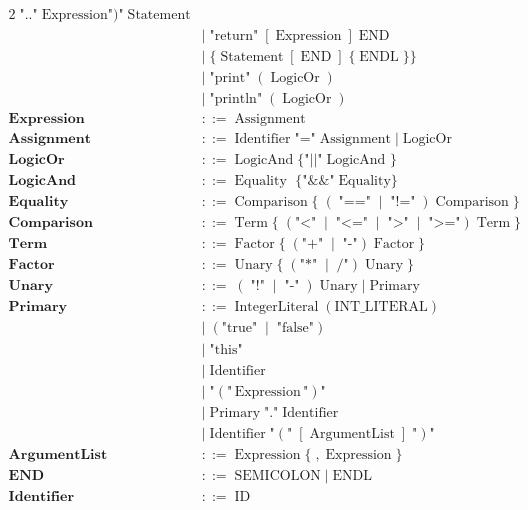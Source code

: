 \documentclass[a4paper,10pt]{article}
\begin{document}
\begin{alignat*}{2}
     \;\text{".."}\;\text{Expression} \text{"})\text{"}\;\text{Statement} \\[4pt]
  \;&\mid\; \text{"return"}\;[\;\text{Expression}\;]\;\text{END} \\[4pt]
  \;&\mid\; \{\;\text{Statement}\;[\;\text{END}\;]\;\{\;\text{ENDL}\;\}\} \\[4pt]
  \;&\mid\; \text{"print"}\; ( \; \text{LogicOr} \; ) \\[4pt]
  \;&\mid\; \text{"println"}\; ( \; \text{LogicOr} \; ) \\[4pt]
\textbf{Expression}
  \;&::=\; \text{Assignment} \\[4pt]
\textbf{Assignment}
  \;&::=\; \text{Identifier}\;\text{"="}\;\text{Assignment}
   \;|\;\text{LogicOr} \\[4pt]
\textbf{LogicOr}
  \;&::=\; \text{LogicAnd} \;\text{\{ "||"}\;\text{LogicAnd \}} \\[4pt]
\textbf{LogicAnd}
  \;&::=\; \text{Equality} \;\text{ \{"\&\&"}\;\text{Equality\}} \\[4pt]
\textbf{Equality}
  \;&::=\; \text{Comparison} \; \{ \; ( \; \text{"=="}\;\mid\;\text{"!="}\;)\;\text{Comparison} \; \}   \\[4pt]
\textbf{Comparison}
  \;&::=\; \text{Term}\; \{\;(\text{"<"}\;\mid\;\text{"<="}\;\mid\;\text{">"}\;\mid\;\text{">="})\;\text{Term} \;\}\\[4pt]
\textbf{Term}
  \;&::=\; \text{Factor}\;\{ \;(\text{"+"}\;\mid\;\text{"-"})\;\text{Factor}\; \} \\[4pt]
\textbf{Factor}
  \;&::=\; \text{Unary}\;\{ \;(\text{"*"}\;\mid\;\text{/"})\;\text{Unary}\; \} \\[4pt]
\textbf{Unary}
  \;&::=\; (\;\text{"!"}\;\mid\;\text{"-"}\;)\;\text{Unary}
   \;|\;\text{Primary} \\[4pt]
\textbf{Primary}
  \;&::=\; \text{IntegerLiteral}\;( \text{INT\_LITERAL} ) \\[2pt]
  \;&\mid\; ( \text{"true"}\;\mid\;\text{"false"} ) \\[2pt]
  \;&\mid\; \text{"this"} \\[2pt]
  \;&\mid\; \text{Identifier} \\[2pt]
  \;&\mid\; \text{"}(\text{"}\,\text{Expression}\,\text{"})\text{"} \\[2pt]
  \;&\mid\; \text{Primary}\;\text{"."}\;\text{Identifier} \\[2pt]
  \;&\mid\; \text{Identifier}\;\text{"}(\text{"} \; [\;\text{ArgumentList}\;]\; \text{"})\text{"} \\[4pt]
\textbf{ArgumentList}
  \;&::=\; \text{Expression}\; \{ \;,\;\text{Expression} \; \} \\[4pt]
\textbf{END}
  \;&::=\; \text{SEMICOLON}
   \;|\;\text{ENDL} \\[4pt]
\textbf{Identifier}
  \;&::=\; \text{ID} \\[4pt]
\end{alignat*}
\end{document}
